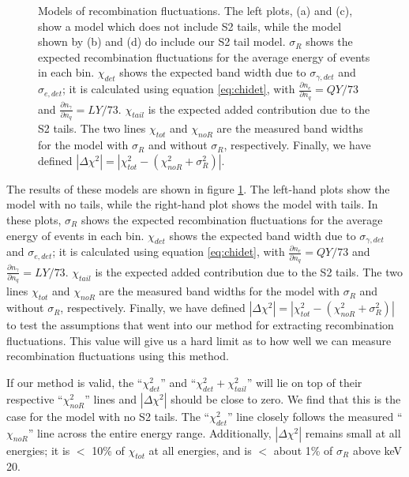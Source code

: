 {\begin{figure}[p]
\caption{Models of recombination fluctuations. The left plots, (a) and (c), show a model which does not include S2 tails, while the model shown by (b) and (d) do include our S2 tail model. $\sigma_{R}$ shows the expected recombination fluctuations for the average energy of events in each bin. $\chi_{det}$ shows the expected band width due to $\sigma_{\gamma,det}$ and $\sigma_{e,det}$; it is calculated using equation \ref{eq:chidet}, with $\frac{\partial n_e}{\partial n_{q}}=QY/73$ and $\frac{\partial n_{\gamma}}{\partial n_{q}}=LY/73$. $\chi_{tail}$ is the expected added contribution due to the S2 tails. The two lines $\chi_{tot}$ and $\chi_{noR}$ are the measured band widths for the model with $\sigma_R$ and without $\sigma_R$, respectively. Finally, we have defined $|\Delta\chi^2|= | \chi_{tot}^2-(\chi_{noR}^2+\sigma_R^2)|$.}
\label{fig:toysigr}
\end{figure}
    \clearpage
}

The results of these models are shown in figure \ref{fig:toysigr}. The left-hand plots show the model with no tails, while the right-hand plot shows the model with tails. In these plots, $\sigma_{R}$ shows the expected recombination fluctuations for the average energy of events in each bin. $\chi_{det}$ shows the expected band width due to $\sigma_{\gamma,det}$ and $\sigma_{e,det}$; it is calculated using equation \ref{eq:chidet}, with $\frac{\partial n_e}{\partial n_{q}}=QY/73$ and $\frac{\partial n_{\gamma}}{\partial n_{q}}=LY/73$. $\chi_{tail}$ is the expected added contribution due to the S2 tails. The two lines $\chi_{tot}$ and $\chi_{noR}$ are the measured band widths for the model with $\sigma_R$ and without $\sigma_R$, respectively. Finally, we have defined $|\Delta\chi^2|= | \chi_{tot}^2-(\chi_{noR}^2+\sigma_R^2)|$ to test the assumptions that went into our method for extracting recombination fluctuations. This value will give us a hard limit as to how well we can measure recombination fluctuations using this method.

If our method is valid, the ``$\chi_{det}^2$'' and ``$\chi_{det}^2+\chi_{tail}^2$'' will lie on top of their respective ``$\chi_{noR}^2$'' lines and $|\Delta\chi^2|$ should be close to zero. We find that this is the case for the model with no S2 tails. The ``$\chi_{det}^2$'' line closely follows the measured ``$\chi_{noR}$'' line across the entire energy range. Additionally, $|\Delta\chi^2|$ remains small at all energies; it is $<$ 10\% of $\chi_{tot}$ at all energies, and is $<$ about 1\% of $\sigma_R$ above keV 20.

